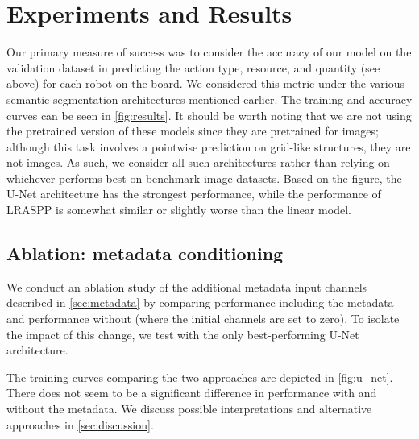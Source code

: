 \documentclass[10pt,twocolumn,letterpaper]{article}
\begin{document}
\section{Experiments and Results}
\label{sec:results}

Our primary measure of success was to consider the accuracy of our
model on the validation dataset in predicting the action type,
resource, and quantity (see above) for each robot on the board.
We considered this metric under the various semantic
segmentation architectures mentioned earlier.
The training and accuracy curves can be seen in \autoref{fig:results}.
It should be worth noting that we are not using the pretrained version
of these models since they are pretrained for images; although this task
involves a pointwise prediction on grid-like structures, they are not images.
As such, we consider all such architectures rather than relying
on whichever performs best on benchmark image datasets.
Based on the figure, the U-Net architecture has the
strongest performance, while the performance of LRASPP is
somewhat similar or slightly worse than the linear model.


\subsection{Ablation: metadata conditioning}\label{sec:results:metadata}

We conduct an ablation study of the additional metadata input channels
described in \autoref{sec:metadata} by comparing performance including the
metadata and performance without (where the initial channels are set to zero).
To isolate the impact of this change, we test
with the only best-performing U-Net architecture.

The training curves comparing the two
approaches are depicted in \autoref{fig:u_net}.
There does not seem to be a significant difference
in performance with and without the metadata.
We discuss possible interpretations and alternative
approaches in \autoref{sec:discussion}.

\end{document}
